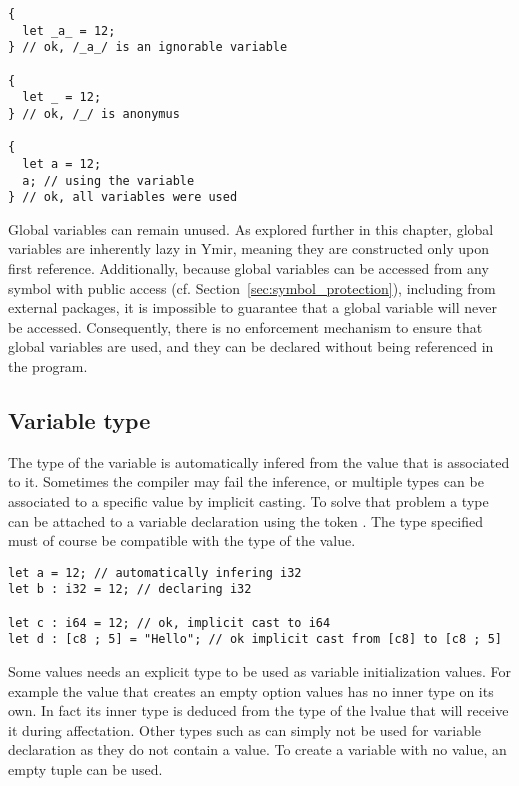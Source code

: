 \begin{lstlisting}[style=coloredverbatim, escapechar=@]
{
  let _a_ = 12;
} // ok, /_a_/ is an ignorable variable

{
  let _ = 12;
} // ok, /_/ is anonymus

{
  let a = 12;
  a; // using the variable
} // ok, all variables were used
\end{lstlisting}

Global variables can remain unused. As explored further in this chapter, global
variables are inherently lazy in Ymir, meaning they are constructed only upon
first reference. Additionally, because global variables can be accessed from any
symbol with public access (cf. Section~\ref{sec:symbol_protection}), including
from external packages, it is impossible to guarantee that a global variable
will never be accessed. Consequently, there is no enforcement mechanism to
ensure that global variables are used, and they can be declared without being
referenced in the program.

\subsection{Variable type}
\label{sec:variable_type}

The type of the variable is automatically infered from the value that is
associated to it. Sometimes the compiler may fail the inference, or multiple
types can be associated to a specific value by implicit casting. To solve that
problem a type can be attached to a variable declaration using the token
\token{:}. The type specified must of course be compatible with the type of the
value.

\begin{lstlisting}[style=coloredverbatim, escapechar=@]
let a = 12; // automatically infering i32
let b : i32 = 12; // declaring i32

let c : i64 = 12; // ok, implicit cast to i64
let d : [c8 ; 5] = "Hello"; // ok implicit cast from [c8] to [c8 ; 5]
\end{lstlisting}

Some values needs an explicit type to be used as variable initialization values.
For example the value  that creates an empty option values has no
inner type on its own. In fact its inner type is deduced from the type of the
lvalue that will receive it during affectation. Other types such as 
can simply not be used for variable declaration as they do not contain a value.
To create a variable with no value, an empty tuple \token{()} can be used.

